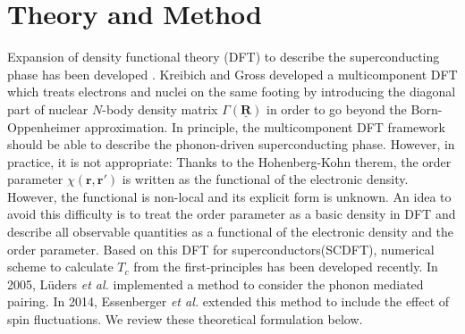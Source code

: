 

%
%
\chapter{Theory and Method}
\label{theory}
%
%
%
%
Expansion of density functional theory\cite{HK1964,KS1965} (DFT) to describe the superconducting phase 
has been developed
. Kreibich and Gross\cite{Kreibich2001} developed a multicomponent DFT which treats electrons and 
nuclei on the same footing by introducing the diagonal part of nuclear $N$-body density matrix 
$\Gamma(\underline{\bm R})$ in order to go beyond the Born-Oppenheimer approximation.
In principle, the multicomponent DFT framework should be able to describe the phonon-driven 
superconducting phase. However, in practice, it is not appropriate: Thanks to the 
Hohenberg-Kohn therem\cite{HK1964}, the order parameter $\chi(\bm r, \bm r')$ is written as the 
functional of the electronic density. However, the functional is non-local and its explicit form 
is unknown. An idea\cite{Oliveira1988} to avoid this difficulty 
is to treat the order parameter as a basic density in DFT and describe all observable quantities
as a functional of the electronic density and the order parameter.
Based on this DFT for superconductors(SCDFT), numerical scheme to calculate $T_c$ from the
first-principles has been developed recently. In 2005, L\"{u}ders {\it et al.} implemented a 
method\cite{Luders2005} to consider the phonon mediated pairing. In 2014, Essenberger {\it et al.}
\cite{Essenberger2014} extended this method to include the effect of spin fluctuations.
We review these theoretical formulation below.


